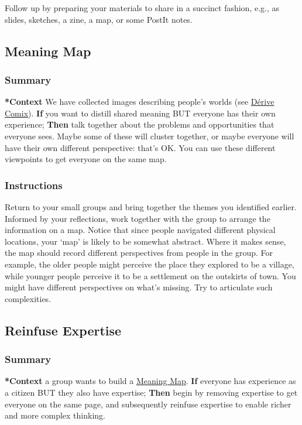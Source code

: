 \documentclass[11pt]{article}
\begin{document}
Follow up by preparing your materials to share in a succinct fashion,
e.g., as slides, sketches, a zine, a map, or some PostIt notes.
\subsection{Meaning Map}
\label{407beae8-ab2f-4340-9552-211d3b92ede6}
\subsubsection{Summary}
\label{sec:org28f58fb}

\textbf{*Context} We have collected images describing people's worlds (see
\hyperref[615846a2-1795-40b4-8dfb-3e12923fccc0]{Dérive Comix}). \textbf{If} you want to distill shared meaning BUT everyone has
their own experience; \textbf{Then} talk together about the problems and
opportunities that everyone sees. Maybe some of these will cluster
together, or maybe everyone will have their own different perspective:
that's OK. You can use these different viewpoints to get everyone on
the same map.

\subsubsection{Instructions}
\label{sec:org679c057}

Return to your small groups and bring together the themes you
identified earlier.  Informed by your reflections, work together with
the group to arrange the information on a map.  Notice that since
people navigated different physical locations, your ‘map’ is likely to
be somewhat abstract.  Where it makes sense, the map should record
different perspectives from people in the group.  For example, the
older people might perceive the place they explored to be a village,
while younger people perceive it to be a settlement on the outskirts
of town.  You might have different perspectives on what’s missing.
Try to articulate such complexities.
\subsection{Reinfuse Expertise}
\label{bf8791b5-e50b-4666-bc01-286e279a5971}
\subsubsection{Summary}
\label{sec:orga340b4e}

\textbf{*Context} a group wants to build a \hyperref[407beae8-ab2f-4340-9552-211d3b92ede6]{Meaning Map}. \textbf{If} everyone has
experience as a citizen BUT they also have expertise; \textbf{Then} begin by
removing expertise to get everyone on the same page, and subsequently
reinfuse expertise to enable richer and more complex thinking.
\end{document}
